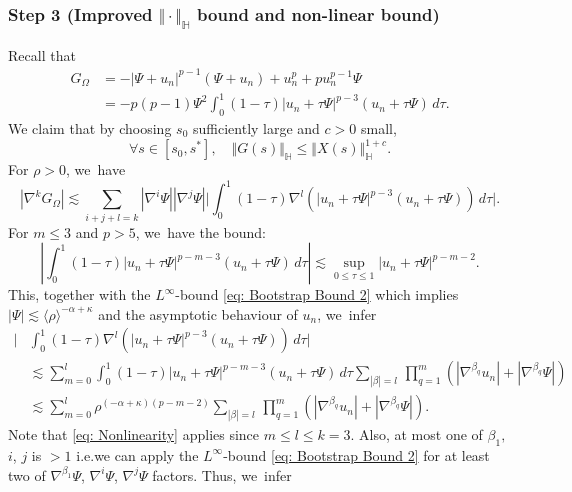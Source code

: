 \documentclass[10pt]{article}
\newcommand{\ie}{i.e.}
\theoremstyle{plain}
\theoremstyle{definition}
\begin{document}
\subsubsection*{Step 3 (Improved $\Vert \cdot\Vert_{\mathbb H}$ bound and non-linear bound)}
Recall that
\begin{equation}
\label{eq: Integral Form of Nonlinearity}
\begin{aligned}
G_\Omega&=-|\Psi+u_n|^{p-1}(\Psi+u_n)+u_n^p+pu_n^{p-1}\Psi\\
&=-p(p-1)\Psi^2\int_0^1(1-\tau)|u_n+\tau\Psi|^{p-3}(u_n+\tau\Psi)\,d\tau.
\end{aligned}
\end{equation}
We claim that by choosing $s_0$ sufficiently large and $c>0$ small,
\begin{equation}
\label{eq: Nonlinear Bound 2}
\forall s\in [s_0,s^*],\quad \Vert G(s)\Vert_{\mathbb H}\le\Vert X(s)\Vert_{\mathbb H}^{1+c}.
\end{equation}
For $\rho>0$, we~have
\begin{equation}
\label{eq: Derivative Nonlinearity}
|\nabla^k G_\Omega|\lesssim \sum_{i+j+l=k}|\nabla^i\Psi||\nabla^j\Psi| \bigg|\int_0^1(1-\tau)\nabla^l\left(|u_n+\tau\Psi|^{p-3}(u_n+\tau\Psi)\right)\,d\tau\bigg|.
\end{equation}
For $m\le 3$ and $p>5$, we~have the bound:
\begin{equation}
\label{eq: Nonlinearity}
\left|\int_0^1(1-\tau)|u_n+\tau\Psi|^{p-m-3}(u_n+\tau\Psi)\,d\tau\right|\lesssim \sup_{0\le\tau\le1}|u_n+\tau\Psi|^{p-m-2}.
\end{equation}
This, together with the $L^\infty$-bound \eqref{eq: Bootstrap Bound 2} which implies $|\Psi|\lesssim \langle\rho\rangle^{-\alpha+\kappa}$ and the asymptotic behaviour of $u_n$, we~infer
\begin{equation}
\label{eq: Nonlinearity Expansion}
\begin{aligned}
\bigg|&\int_0^1(1-\tau)\nabla^l\left(|u_n+\tau\Psi|^{p-3}(u_n+\tau\Psi)\right)\,d\tau\bigg|\\
&\lesssim \sum_{m=0}^l\int_0^1(1-\tau)|u_n+\tau\Psi|^{p-m-3}(u_n+\tau\Psi)\,d\tau\sum_{|\beta|=l}\,\prod_{q=1}^m(|\nabla^{\beta_q}u_n|+|\nabla^{\beta_q}\Psi|)\\
&\lesssim \sum_{m=0}^l\rho^{(-\alpha+\kappa)(p-m-2)}\sum_{|\beta|=l}\,\prod_{q=1}^m(|\nabla^{\beta_q}u_n|+|\nabla^{\beta_q}\Psi|).
\end{aligned}
\end{equation}
Note that \eqref{eq: Nonlinearity} applies since $m\le l\le k=3$. Also, at most one of $\beta_1,$ $i$, $j$ is $>1$ \ie we can apply the $L^\infty$-bound \eqref{eq: Bootstrap Bound 2} for at least two of $\nabla^{\beta_1}\Psi$, $\nabla^i\Psi$, $\nabla^j\Psi$ factors. Thus, we~infer
\end{document}
